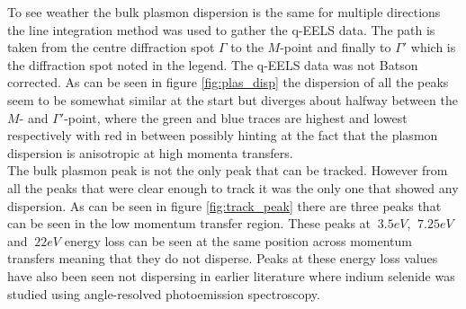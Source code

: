 To see weather the bulk plasmon dispersion is the same for multiple directions the line integration method was used to gather the q-EELS data. The path is taken from the centre diffraction spot $\Gamma$ to the $M$-point and finally to $\Gamma '$ which is the diffraction spot noted in the legend. The q-EELS data was not Batson corrected. As can be seen in figure \ref{fig:plas_disp} the dispersion of all the peaks seem to be somewhat similar at the start but diverges about halfway between the $M$- and $\Gamma '$-point, where the green and blue traces are highest and lowest respectively with red in between possibly hinting at the fact that the plasmon dispersion is anisotropic at high momenta transfers.\\
The bulk plasmon peak is not the only peak that can be tracked. However from all the peaks that were clear enough to track it was the only one that showed any dispersion. As can be seen in figure \ref{fig:track_peak} there are three peaks that can be seen in the low momentum transfer region. These peaks at $~3.5eV$, $~7.25eV$ and $~22eV$ energy loss can be seen at the same position across momentum transfers meaning that they do not disperse. Peaks at these energy loss values have also been seen not dispersing in earlier literature \cite{Politano2017} where indium selenide was studied using angle-resolved photoemission spectroscopy.